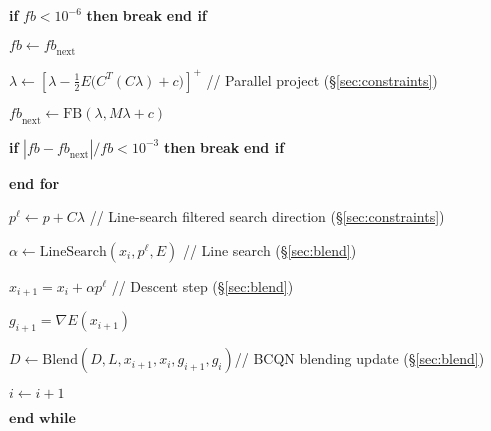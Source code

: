 \begin{algorithm}[h!]
\hspace{20pt}\textbf{if} $\mathit{fb} < 10^{-6}$ \textbf{then} \hspace{3pt} \textbf{break} \hspace{5pt} \textbf{end if}

\hspace{20pt}$\mathit{fb} \leftarrow \mathit{fb}_\mathrm{next}$ 

\hspace{20pt} $\lambda \leftarrow [\lambda - \tfrac{1}{2} E \big(C^T (C \lambda) + c\big)]^+$ // Parallel project  (\S\ref{sec:constraints})

\hspace{20pt}$\mathit{fb}_\mathrm{next} \leftarrow \textrm{FB}(\lambda, M  \lambda  +  c)$  

\hspace{20pt}\textbf{if}  $|\mathit{fb} - \mathit{fb}_\mathrm{next}| / \mathit{fb} < 10^{-3}$ \textbf{then} \hspace{3pt} \textbf{break} \hspace{5pt} \textbf{end if}

\hspace{10pt}\textbf{end for}

\hspace{10pt} $p^\ell \leftarrow p + C \lambda$ \hspace{10pt}// Line-search filtered search direction  (\S\ref{sec:constraints})

\hspace{10pt}$\alpha \leftarrow \text{LineSearch}(x_i, p^\ell, E)$ \hspace{10pt} // Line search (\S\ref{sec:blend})

\hspace{10pt}$x_{i+1} = x_i + \alpha p^\ell$  \hspace{10pt} // Descent step (\S\ref{sec:blend})

\hspace{10pt} $g_{i+1} = \nabla E(x_{i+1})$

\hspace{10pt}$D \leftarrow \text{Blend}(D, L, x_{i+1}, x_i, g_{i+1}, g_i)$\hspace{10pt}// BCQN blending update (\S\ref{sec:blend})

\hspace{10pt}$i \leftarrow i+1$

$\textbf{end while}$

\end{algorithm}

